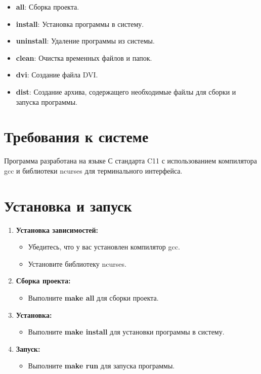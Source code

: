 \documentclass[12pt, letterpaper, twoside]{article}
\begin{document}
\begin{itemize}
    \item \textbf{all}: Сборка проекта.
    \item \textbf{install}: Установка программы в систему.
    \item \textbf{uninstall}: Удаление программы из системы.
    \item \textbf{clean}: Очистка временных файлов и папок.
    \item \textbf{dvi}: Создание файла DVI.
    \item \textbf{dist}: Создание архива, содержащего необходимые файлы для сборки и запуска программы.
\end{itemize}

\section{Требования к системе}

Программа разработана на языке С стандарта C11 с использованием компилятора gcc и библиотеки ncurses для терминального интерфейса.

\section{Установка и запуск}

\begin{enumerate}
    \item \textbf{Установка зависимостей:}
        \begin{itemize}
            \item Убедитесь, что у вас установлен компилятор gcc.
            \item Установите библиотеку ncurses.
        \end{itemize}
    \item \textbf{Сборка проекта:}
        \begin{itemize}
            \item Выполните \textbf{make all} для сборки проекта.
        \end{itemize}
    \item \textbf{Установка:}
        \begin{itemize}
            \item Выполните \textbf{make install} для установки программы в систему.
        \end{itemize}
    \item \textbf{Запуск:}
        \begin{itemize}
            \item Выполните \textbf{make run} для запуска программы.
        \end{itemize}
\end{enumerate}
\end{document}
